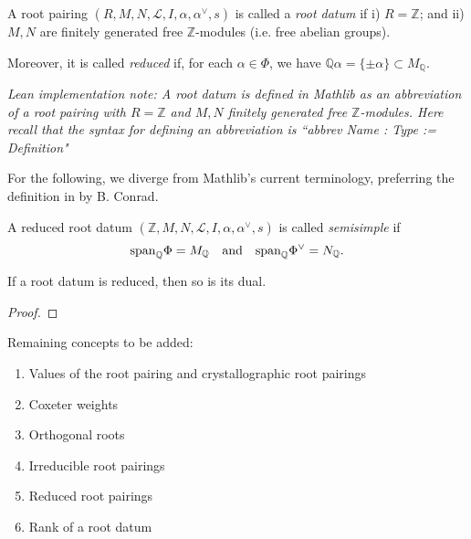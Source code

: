 \begin{definition}
    \label{def:root-datum}
    \leanok
     A root pairing $(R,M,N,\mathcal{L},I,\alpha, \alpha^\vee,s)$ is called a {\it root datum} if 
    i) $R = \mathbb{Z}$; and ii) $M,N$ are finitely generated free $\mathbb{Z}$-modules (i.e. free abelian groups).
    
    Moreover, it is called {\it reduced} if, for each $\alpha \in \Phi$, we have 
    $\mathbb{Q}\alpha = \{\pm \alpha\} \subset M_{\mathbb{Q}}$.
\end{definition}

{\it Lean implementation note: A root datum is defined in Mathlib as an abbreviation of 
a root pairing with $R = \mathbb{Z}$ and $M,N$ finitely generated free $\mathbb{Z}$-modules. Here 
recall that the syntax for defining an abbreviation is ``abbrev Name : Type := Definition"}

For the following, we diverge from Mathlib's current terminology, preferring the definition in 
by B. Conrad. 
\begin{definition}
    \label{def:rp-semisimple}
    \leanok
    A reduced root datum $(\mathbb{Z},M,N,\mathcal{L},I,\alpha, \alpha^\vee,s)$ is called {\it semisimple} if
    \[
        {\rm span}_{\mathbb{Q}} \Phi = M_{\mathbb{Q}} \quad \text{and} \quad {\rm span}_{\mathbb{Q}} \Phi^\vee = N_{\mathbb{Q}}.
    \] 
\end{definition}

\begin{lemma}
    If a root datum is reduced, then so is its dual. 
\end{lemma}
\begin{proof}
    
\end{proof}




Remaining concepts to be added:
\begin{enumerate}
    \item Values of the root pairing and crystallographic root pairings
    \item Coxeter weights
    \item Orthogonal roots 
    \item Irreducible root pairings
    \item Reduced root pairings
    \item Rank of a root datum 
\end{enumerate}